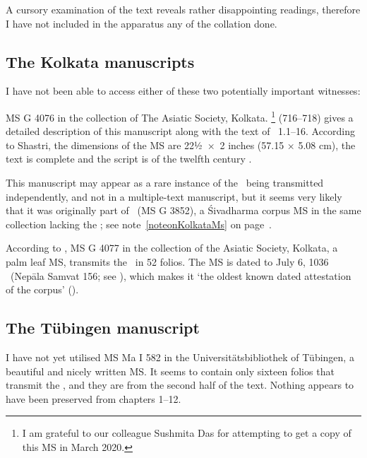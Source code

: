 A cursory examination of the text reveals rather disappointing 
readings, therefore I have not included  in the apparatus
any of the collation done.

\medskip
\subsection{The Kolkata manuscripts}

I have not been able to access either of these two
potentially important witnesses:

MS G 4076 in the collection of The Asiatic Society, Kolkata.%
	\footnote{I am grateful to our colleague 
				     Sushmita Das for attempting to 
					get a copy of this MS in March 2020.}
 (716--718) gives a 
detailed description of this manuscript along with the text
of \VSS\ 1.1--16. According to Shastri, the dimensions of the MS are
22½~×~2 inches (57.15 × 5.08 cm), the text is complete and
the script is of the twelfth century \CE. 

This manuscript may appear as a rare instance of the \VSS\
being transmitted independently, and not in a multiple-text
manuscript, but it seems very likely that it was originally part of
\msKob\ (MS G 3852), a Śivadharma corpus MS  in the same collection lacking the \VSS; see note~\ref{noteonKolkataMs}
on page~\pageref{noteonKolkataMs}.



According to ,
MS G 4077 in the collection of the Asiatic Society, Kolkata,
a palm leaf MS, transmits the \VSS\ in 52 folios.
The MS is dated to July 6, 1036 \CE\ (Nepāla Samvat 156; 
see ), which makes
it `the oldest known dated attestation of the corpus'
().


\medskip
\subsection{The Tübingen manuscript}

I have not yet utilised MS Ma I 582 in the Universitätsbibliothek of
Tübingen, a beautiful and nicely written MS. It seems to contain only sixteen folios that transmit the \VSS, and they are from the
second half of the text. Nothing appears to have been preserved
from chapters 1--12.



